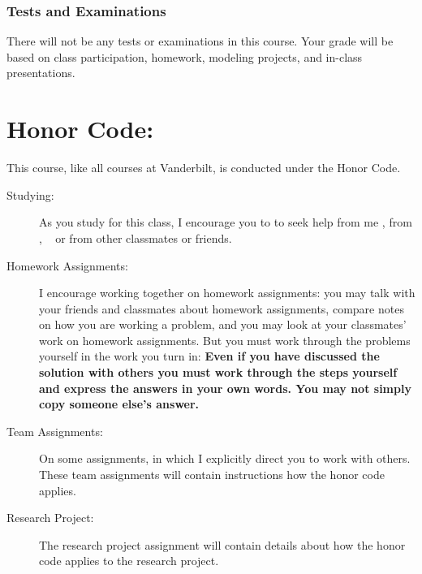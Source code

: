\documentclass[11pt,twoside]{jgsyllabus}\usepackage[]{graphicx}\usepackage[]{xcolor}
\begin{document}
\subsubsection{Tests and Examinations}
There will not be any tests or examinations in this course. Your grade will be
based on class participation, homework, modeling projects, and in-class
presentations.

%
%

\section{Honor Code:}
This course, like all courses at Vanderbilt, is conducted under the Honor Code.
\begin{description}
\item[Studying:] As you study for this class, I encourage you to to seek help from me%
\ifTA
, from \TaTitle,
\else
\
\fi
or from other classmates or friends.

\item[Homework Assignments:] I encourage working together
on homework assignments: you may talk with your friends and classmates about
homework assignments, compare notes on how you are working a problem, and you
may look at your classmates' work on homework assignments.
But you must work through the problems yourself
in the work you turn in:
\textbf{Even if you have discussed the solution with others you must work
through the steps yourself and express the answers in your own words. You may
not simply copy someone else's answer.}

\item[Team Assignments:] On some assignments, in which I explicitly direct you
to work with others.
These team assignments will contain instructions how the honor code applies.

\item[Research Project:] The research project assignment will contain details
about how the honor code applies to the research project.
\end{description}
\end{document}
